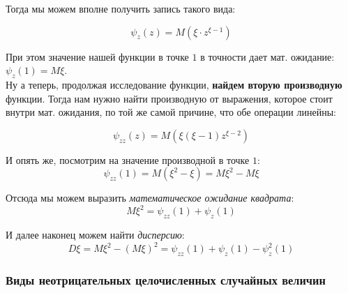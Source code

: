 \documentclass{article}
\begin{document}
Тогда мы можем вполне получить запись такого вида:

$$\psi_z(z) = M(\xi\cdot z^{\xi - 1})$$

При этом значение нашей функции в точке $1$ в точности дает мат. ожидание: $\psi_z(1) = M\xi$.
\\

Ну а теперь, продолжая исследование функции, \textbf{найдем вторую производную} функции. Тогда нам нужно найти производную от выражения, которое стоит внутри мат. ожидания, по той же самой причине, что обе операции линейны:

$$\psi_{zz}(z) = M(\xi(\xi - 1)z^{\xi - 2})$$

И опять же, посмотрим на значение производной в точке $1$:
$$\psi_{zz}(1) = M(\xi^2 - \xi) = M\xi^2 - M\xi$$

Отсюда мы можем выразить \textit{математическое ожидание квадрата}:
$$M\xi^2 = \psi_{zz}(1) + \psi_z(1)$$

И далее наконец можем найти \textit{дисперсию}:
$$D\xi = M\xi^2 - (M\xi)^2 = \psi_{zz}(1) + \psi_z(1) - \psi_z^2(1)$$

\subsubsection{Виды неотрицательных целочисленных случайных величин}
\end{document}
